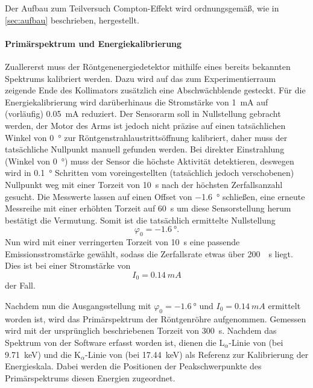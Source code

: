 \documentclass[ngerman]{scrartcl}
\begin{document}
Der Aufbau zum Teilversuch Compton-Effekt wird ordnungsgemäß, wie in \autoref{sec:aufbau} beschrieben, hergestellt.

\paragraph{Primärspektrum und Energiekalibrierung}
Zuallererst muss der Röntgenenergiedetektor mithilfe eines bereits bekannten Spektrums kalibriert werden. Dazu wird auf das zum Experimentierraum zeigende Ende des Kollimators zusätzlich eine Abschwächblende gesteckt. Für die Energiekalibrierung wird darüberhinaus die Stromstärke von \SI{1}{mA} auf (vorläufig) \SI{0.05}{mA} reduziert. Der Sensorarm soll in Nullstellung gebracht werden, der Motor des Arms ist jedoch nicht präzise auf einen tatsächlichen Winkel von \SI{0}{\degree} zur Röntgenstrahlaustrittsöffnung kalibriert, daher muss der tatsächliche Nullpunkt manuell gefunden werden. Bei direkter Einstrahlung (Winkel von \SI{0}{\degree}) muss der Sensor die höchste Aktivität detektieren, deswegen wird in \SI{0.1}{\degree} Schritten vom voreingestellten (tatsächlich jedoch verschobenen) Nullpunkt weg mit einer Torzeit von \SI{10}{s} nach der höchsten Zerfallsanzahl gesucht. Die Messwerte lassen auf einen Offset von \SI{-1.6}{\degree} schließen, eine erneute Messreihe mit einer erhöhten Torzeit auf \SI{60}{s} um diese Sensorstellung herum bestätigt die Vermutung. Somit ist die tatsächlich ermittelte Nullstellung
\[\varphi_0 = \SI{-1.6}{\degree}.\]
Nun wird mit einer verringerten Torzeit von \SI{10}{s} eine passende Emissionsstromstärke gewählt, sodass die Zerfallsrate etwas über \SI{200}{\per\second} liegt. Dies ist bei einer Stromstärke von
\[I_0=\SI{0.14}{mA}\]
der Fall.

Nachdem nun die Ausgangsstellung mit $\varphi_0 = \SI{-1.6}{\degree}$ und $I_0=\SI{0.14}{mA}$ ermittelt worden ist, wird das Primärspektrum der Röntgenröhre aufgenommen. Gemessen wird mit der ursprünglich beschriebenen Torzeit von \SI{300}{s}. Nachdem das Spektrum von der Software erfasst worden ist, dienen die L$_\alpha$-Linie von  (bei \SI{9.71}{keV}) und die K$_\alpha$-Linie von  (bei \SI{17.44}{keV}) als Referenz zur Kalibrierung der Energieskala. Dabei werden die Positionen der Peakschwerpunkte des Primärspektrums diesen Energien zugeordnet.
\end{document}
